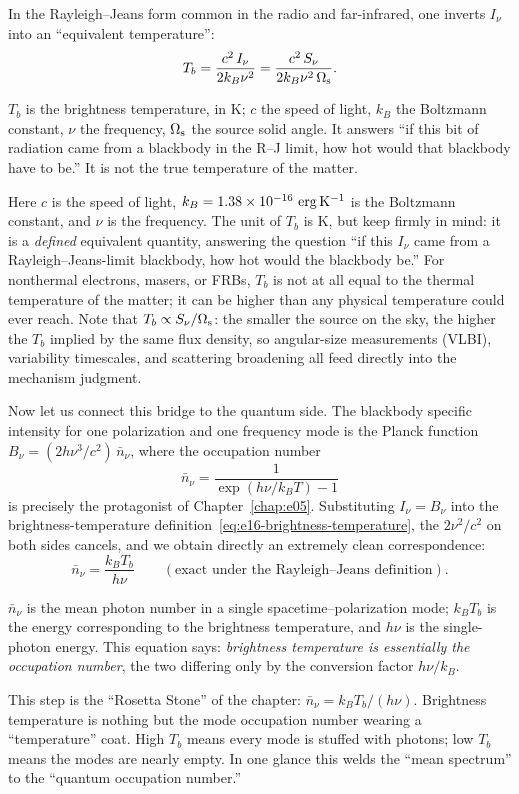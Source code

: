 In the Rayleigh--Jeans form common in the radio and far-infrared, one inverts \(I_\nu\) into an ``equivalent temperature'':
\begin{equation}
  T_b=\frac{c^2\,I_\nu}{2k_B\nu^2}
      =\frac{c^2\,S_\nu}{2k_B\nu^2\,\Omega_{\rm s}} .
  \label{eq:e16-brightness-temperature}
\end{equation}
\begin{formulaexplain}
\(T_b\) is the brightness temperature, in K; \(c\) the speed of light, \(k_B\) the Boltzmann constant, \(\nu\) the frequency, \(\Omega_{\rm s}\) the source solid angle. It answers ``if this bit of radiation came from a blackbody in the R--J limit, how hot would that blackbody have to be.'' It is not the true temperature of the matter.
\end{formulaexplain}
Here \(c\) is the speed of light, \(k_B=1.38\times10^{-16}~{\rm erg\,K^{-1}}\) is the Boltzmann constant, and \(\nu\) is the frequency. The unit of \(T_b\) is K, but keep firmly in mind: it is a \emph{defined} equivalent quantity, answering the question ``if this \(I_\nu\) came from a Rayleigh--Jeans-limit blackbody, how hot would the blackbody be.'' For nonthermal electrons, masers, or FRBs, \(T_b\) is not at all equal to the thermal temperature of the matter; it can be higher than any physical temperature could ever reach. Note that \(T_b\propto S_\nu/\Omega_{\rm s}\): the smaller the source on the sky, the higher the \(T_b\) implied by the same flux density, so angular-size measurements (VLBI), variability timescales, and scattering broadening all feed directly into the mechanism judgment.

Now let us connect this bridge to the quantum side. The blackbody specific intensity for one polarization and one frequency mode is the Planck function \(B_\nu=(2h\nu^3/c^2)\,\bar n_\nu\), where the occupation number
\[
  \bar n_\nu=\frac{1}{\exp(h\nu/k_BT)-1}
\]
is precisely the protagonist of Chapter~\ref{chap:e05}. Substituting \(I_\nu=B_\nu\) into the brightness-temperature definition~\eqref{eq:e16-brightness-temperature}, the \(2\nu^2/c^2\) on both sides cancels, and we obtain directly an extremely clean correspondence:
\begin{equation}
  \bar n_\nu=\frac{k_B T_b}{h\nu}
  \qquad(\text{exact under the Rayleigh--Jeans definition}).
  \label{eq:e16-occupation-from-tb}
\end{equation}
\begin{formulaexplain}
\(\bar n_\nu\) is the mean photon number in a single spacetime--polarization mode; \(k_B T_b\) is the energy corresponding to the brightness temperature, and \(h\nu\) is the single-photon energy. This equation says: \emph{brightness temperature is essentially the occupation number}, the two differing only by the conversion factor \(h\nu/k_B\).
\end{formulaexplain}
This step is the ``Rosetta Stone'' of the chapter: \(\bar n_\nu=k_B T_b/(h\nu)\). Brightness temperature is nothing but the mode occupation number wearing a ``temperature'' coat. High \(T_b\) means every mode is stuffed with photons; low \(T_b\) means the modes are nearly empty. In one glance this welds the ``mean spectrum'' to the ``quantum occupation number.''


